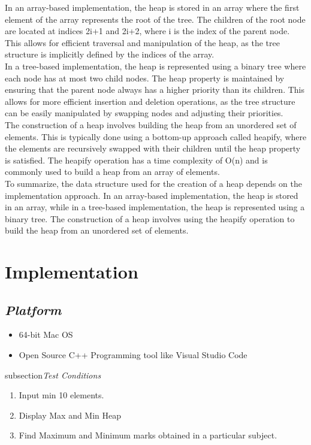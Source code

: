 \documentclass{article}
\begin{document}
In an array-based implementation, the heap is stored in an array where the first element of the array represents the root of the tree. The children of the root node are located at indices 2i+1 and 2i+2, where i is the index of the parent node. This allows for efficient traversal and manipulation of the heap, as the tree structure is implicitly defined by the indices of the array.\\

In a tree-based implementation, the heap is represented using a binary tree where each node has at most two child nodes. The heap property is maintained by ensuring that the parent node always has a higher priority than its children. This allows for more efficient insertion and deletion operations, as the tree structure can be easily manipulated by swapping nodes and adjusting their priorities.\\

The construction of a heap involves building the heap from an unordered set of elements. This is typically done using a bottom-up approach called heapify, where the elements are recursively swapped with their children until the heap property is satisfied. The heapify operation has a time complexity of O(n) and is commonly used to build a heap from an array of elements.\\

To summarize, the data structure used for the creation of a heap depends on the implementation approach. In an array-based implementation, the heap is stored in an array, while in a tree-based implementation, the heap is represented using a binary tree. The construction of a heap involves using the heapify operation to build the heap from an unordered set of elements.
\section{\textbf{Implementation}}
\subsection{\textit{Platform}}
\begin{itemize}
	\item 64-bit Mac OS
	\item Open Source C++ Programming tool like Visual Studio Code
\end{itemize}
subsection{\textit{Test Conditions}}
\begin{enumerate}
    \item Input min 10 elements.
	\item Display Max and Min Heap
	\item Find Maximum and Minimum marks obtained in a particular subject.
\end{enumerate}
\end{document}
